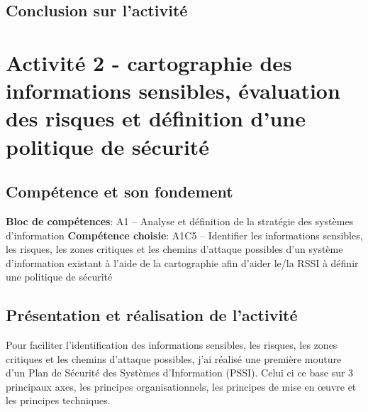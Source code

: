 \documentclass[a4paper, 11pt]{report}
\begin{document}
\subsection{Conclusion sur l'activité}

\section{Activité 2 - cartographie des informations sensibles, évaluation des risques et définition d'une politique de sécurité}
\subsection{Compétence et son fondement}
\textbf{Bloc de compétences}: A1 – Analyse et définition de la stratégie des systèmes d’information
\newline
\textbf{Compétence choisie}: A1C5 – Identifier les informations sensibles, les risques, les zones critiques et les chemins d’attaque possibles d’un système d’information existant à l’aide de la cartographie afin d’aider le/la RSSI à définir une politique de sécurité
\subsection{Présentation et réalisation de l'activité}
  Pour faciliter l'identification des informations sensibles, les risques, les zones critiques et les chemins d’attaque possibles, j'ai réalisé une première mouture d'un Plan de Sécurité des Systèmes d'Information (PSSI).
  Celui ci ce base sur 3 principaux axes, les principes organisationnels, les principes de mise en œuvre et les principes techniques.
\end{document}
